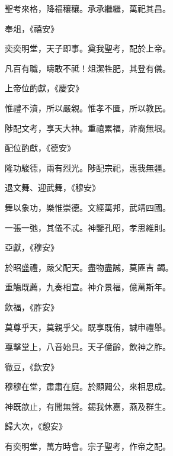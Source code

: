 \begin{pinyinscope}
 聖考來格，降福穰穰。承承繼繼，萬祀其昌。



 奉俎，《禧安》



 奕奕明堂，天子即事。奠我聖考，配於上帝。



 凡百有職，疇敢不祗！俎潔牲肥，其登有儀。



 上帝位酌獻，《慶安》



 惟禮不瀆，所以嚴親。惟孝不匱，所以教民。



 陟配文考，享天大神。重禧累福，祚裔無垠。



 配位酌獻，《德安》



 隆功駿德，兩有烈光。陟配宗祀，惠我無疆。



 退文舞、迎武舞，《穆安》



 舞以象功，樂惟崇德。文經萬邦，武靖四國。



 一張一弛，其儀不忒。神鑒孔昭，孝思維則。



 亞獻，《穆安》



 於昭盛禮，嚴父配天。盡物盡誠，莫匪吉
 蠲。



 重觴既薦，九奏相宣。神介景福，億萬斯年。



 飲福，《胙安》



 莫尊乎天，莫親乎父。既享既侑，誠申禮舉。



 戛擊堂上，八音始具。天子億齡，飲神之胙。



 徹豆，《欽安》



 穆穆在堂，肅肅在庭。於顯闢公，來相思成。



 神既歆止，有聞無聲。錫我休嘉，燕及群生。



 歸大次，《憩安》



 有奕明堂，萬方時會。宗子聖考，作帝之配。




\end{pinyinscope}
